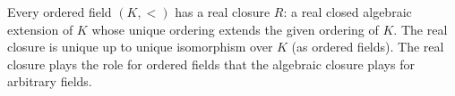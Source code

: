 Every ordered field $(K, <)$ has a real closure $R$: a real closed algebraic extension of $K$ whose unique ordering extends the given ordering of $K$. The real closure is unique up to unique isomorphism over $K$ (as ordered fields). The real closure plays the role for ordered fields that the algebraic closure plays for arbitrary fields.
